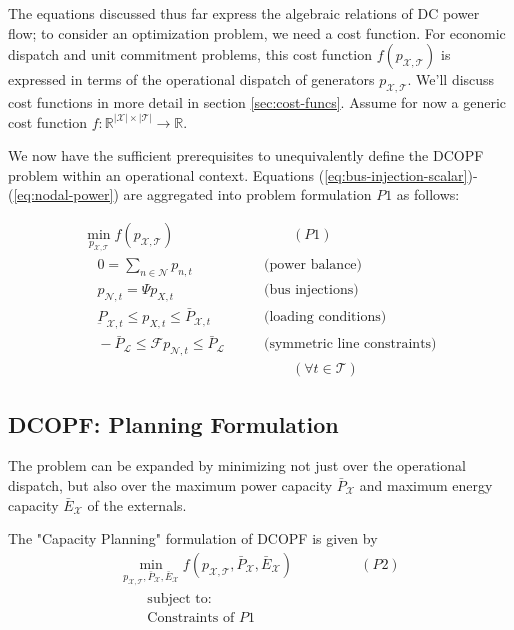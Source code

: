 \documentclass[journal,11pt]{IEEEtran}
\newcommand{\R}{\mathbb{R}}
\renewcommand{\L}{\mathcal{L}}
\newcommand{\X}{\mathcal{X}}
\newcommand{\T}{\mathcal{T}}
\newcommand{\N}{\mathcal{N}}
\newcommand{\sizeX}{\left\vert \X \right\vert}
\newcommand{\sizeT}{\left\vert \T \right\vert}
\begin{document}
The equations discussed thus far express the algebraic relations of DC power flow; to consider an optimization problem, we need
a cost function. For economic dispatch and unit commitment problems, this cost function $f(p_{\X,\T})$ is expressed in terms of the operational
dispatch of generators $p_{\X,\T}$. We'll discuss cost functions in more detail in section \ref{sec:cost-funcs}.  Assume for now a generic
cost function $f: \R^{\sizeX \times \sizeT} \to \R$.

We now have the sufficient prerequisites to unequivalently define the DCOPF problem within an operational context. Equations
(\ref{eq:bus-injection-scalar})-(\ref{eq:nodal-power}) are aggregated into problem formulation $P1$ as follows:

\begin{align*}
\min_{p_{\X, \T}} f(p_{\X, \T})  &\qquad\qquad (P1)\\
    \quad 0 = \sum_{n\in\N} p_{n, t}    &\qquad \text{(power balance)} \\
    \quad p_{\N, t} = \Psi p_{X, t}  &\qquad \text{(bus injections)} \\
    \quad \underbar{P}_{\X, t} \leq  p_{X, t}  \leq  \bar{P}_{\X, t}  &\qquad
        \text{(loading conditions)} \\
    \quad -\bar{P}_\L \leq \mathcal{F} p_{\N, t} \leq \bar{P}_\L
        &\qquad \text{(symmetric line constraints)} \\
&\qquad \qquad(\forall t \in \T)
\end{align*}



\subsection{DCOPF: Planning Formulation}
The problem can be expanded by minimizing not just over the operational
dispatch, but also over the maximum power capacity $\bar{P}_\X$
and maximum energy capacity $\bar{E}_\X$ of the externals.

The "Capacity Planning" formulation of DCOPF is given by
\begin{align*}
\min_{p_{\X, \T}, \bar{P}_{\X}, \bar{E}_{\X}} f(p_{\X, \T}, \bar{P}_\X, \bar{E}_\X)  &\qquad\qquad (P2)\\
    \qquad \text{subject to:}  \\
    \qquad \text{Constraints of }P1
\end{align*}
\end{document}
